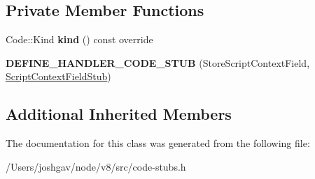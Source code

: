 \subsection*{Private Member Functions}
\begin{DoxyCompactItemize}
\item 
Code\+::\+Kind {\bfseries kind} () const  override\hypertarget{classv8_1_1internal_1_1_store_script_context_field_stub_a07aca263c2e10f2bdf476b4d09f56285}{}\label{classv8_1_1internal_1_1_store_script_context_field_stub_a07aca263c2e10f2bdf476b4d09f56285}

\item 
{\bfseries D\+E\+F\+I\+N\+E\+\_\+\+H\+A\+N\+D\+L\+E\+R\+\_\+\+C\+O\+D\+E\+\_\+\+S\+T\+UB} (Store\+Script\+Context\+Field, \hyperlink{classv8_1_1internal_1_1_script_context_field_stub}{Script\+Context\+Field\+Stub})\hypertarget{classv8_1_1internal_1_1_store_script_context_field_stub_ac2bec81487de8449e86d0c527f58a058}{}\label{classv8_1_1internal_1_1_store_script_context_field_stub_ac2bec81487de8449e86d0c527f58a058}

\end{DoxyCompactItemize}
\subsection*{Additional Inherited Members}


The documentation for this class was generated from the following file\+:\begin{DoxyCompactItemize}
\item 
/\+Users/joshgav/node/v8/src/code-\/stubs.\+h\end{DoxyCompactItemize}
